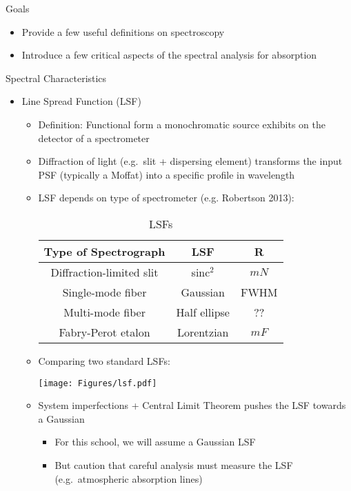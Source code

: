 \documentclass[12pt,letterpaper]{article}
\begin{document}

\begin{Aenumerate}

{\bf \item Goals}
 \begin{itemize}
 \item Provide a few useful definitions on spectroscopy
 \item Introduce a few critical aspects of the spectral analysis
 for absorption
 \end{itemize}

{\bf \item Spectral Characteristics}
 \begin{itemize}
  \item Line Spread Function (LSF)
  	\begin{itemize}
  	\item Definition: Functional form a monochromatic source exhibits 
  	on the detector of a spectrometer
  	\item Diffraction of light (e.g.\ slit + dispersing element)
  	transforms the input PSF (typically a Moffat) into a specific 
  	profile in wavelength
  	\item LSF depends on type of spectrometer (e.g. Robertson 2013):

\begin{table}[ht]
\begin{center}
\caption{{\sc LSFs}}
\label{tab:F}
\vskip 0.05in
\begin{tabular}{ccc}
\hline
Type of Spectrograph & LSF & R \\
\hline
Diffraction-limited slit & sinc$^2$     & $mN$ \\
Single-mode fiber        & Gaussian     & FWHM \\
Multi-mode fiber         & Half ellipse & ??\\ 
Fabry-Perot etalon       & Lorentzian   & $mF$ \\
\hline
\end{tabular}
\end{center}
\end{table}

  	\item Comparing two standard LSFs:

	\texttt{[image: Figures/lsf.pdf]}

  	\item System imperfections + Central Limit Theorem pushes the LSF 
  	towards a Gaussian
  		\begin{itemize}
  		\item For this school, we will assume a Gaussian LSF
  		\item But caution that careful analysis must measure the LSF
  		(e.g.\ atmospheric absorption lines)
  		\end{itemize}


\end{itemize}
\end{itemize}
\end{Aenumerate}
\end{document}
